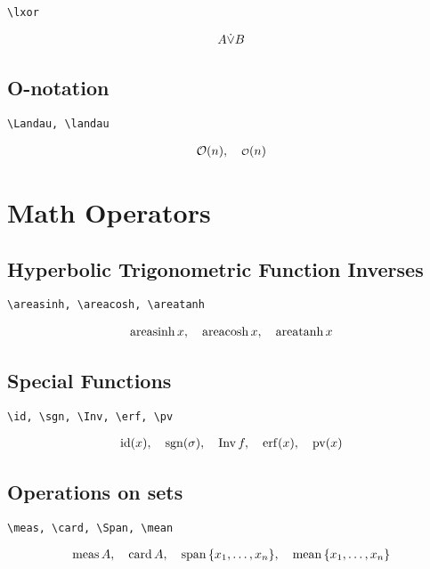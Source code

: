 \documentclass{article}
\begin{document}
\verb|\lxor|

\begin{align*}
    A \dot \lor B
\end{align*}

\subsection{O-notation}

\verb|\Landau, \landau|

\begin{align*}
    \mathcal{O}(n),
    \quad
    {\scriptstyle \mathcal{O}}(n)
\end{align*}


\section{Math Operators}

\subsection{Hyperbolic Trigonometric Function Inverses}

\verb|\areasinh, \areacosh, \areatanh|

\begin{align*}
    \operatorname{areasinh} x,
    \quad
    \operatorname{areacosh} x,
    \quad
    \operatorname{areatanh} x
\end{align*}

\subsection{Special Functions}

\verb|\id, \sgn, \Inv, \erf, \pv|

\begin{align*}
    \operatorname{id}(x),
    \quad
    \operatorname{sgn}(\sigma),
    \quad
    \operatorname{Inv}{f},
    \quad
    \operatorname{erf}(x),
    \quad
    \operatorname{pv}(x)
\end{align*}

\subsection{Operations on sets}

\verb|\meas, \card, \Span, \mean|

\begin{align*}
    \operatorname{meas} A,
    \quad
    \operatorname{card} A,
    \quad
    \operatorname{span} {\left \{ x_1, \dots, x_n \right \}},
    \quad
    \operatorname{mean} {\left \{ x_1, \dots, x_n \right \}}
\end{align*}
\end{document}
